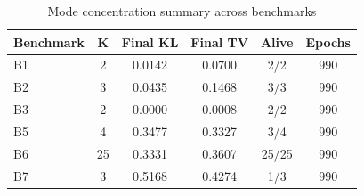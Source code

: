 \begin{table}[h]
\centering
\caption{Mode concentration summary across benchmarks}
\label{tab:mc_summary}
\begin{tabular}{lccccc}
\toprule
Benchmark & K & Final KL & Final TV & Alive & Epochs \\
\midrule
B1 & 2 & 0.0142 & 0.0700 & 2/2 & 990 \\
B2 & 3 & 0.0435 & 0.1468 & 3/3 & 990 \\
B3 & 2 & 0.0000 & 0.0008 & 2/2 & 990 \\
B5 & 4 & 0.3477 & 0.3327 & 3/4 & 990 \\
B6 & 25 & 0.3331 & 0.3607 & 25/25 & 990 \\
B7 & 3 & 0.5168 & 0.4274 & 1/3 & 990 \\
\bottomrule
\end{tabular}
\end{table}
